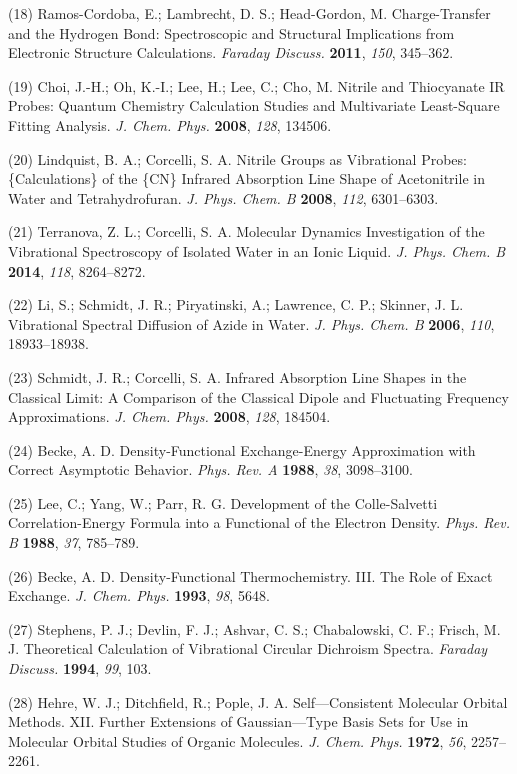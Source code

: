 (18) Ramos-Cordoba, E.; Lambrecht, D. S.; Head-Gordon, M.  Charge-Transfer and the Hydrogen Bond: Spectroscopic and Structural Implications from Electronic Structure Calculations. \emph{Faraday Discuss.} \textbf{2011}, \emph{150}, 345--362.

(19) Choi, J.-H.; Oh, K.-I.; Lee, H.; Lee, C.; Cho, M. Nitrile and Thiocyanate IR Probes: Quantum Chemistry Calculation Studies and Multivariate Least-Square Fitting Analysis. \emph{J. Chem. Phys.}  \textbf{2008}, \emph{128}, 134506.

(20) Lindquist, B. A.; Corcelli, S. A. Nitrile Groups as Vibrational Probes: \{Calculations\} of the \{CN\} Infrared Absorption Line Shape of Acetonitrile in Water and Tetrahydrofuran. \emph{J. Phys. Chem. B} \textbf{2008}, \emph{112}, 6301--6303.

(21) Terranova, Z. L.; Corcelli, S. A. Molecular Dynamics Investigation of the Vibrational Spectroscopy of Isolated Water in an Ionic Liquid.  \emph{J. Phys. Chem. B} \textbf{2014}, \emph{118}, 8264--8272.

(22) Li, S.; Schmidt, J. R.; Piryatinski, A.; Lawrence, C. P.; Skinner, J. L. Vibrational Spectral Diffusion of Azide in Water. \emph{J. Phys.  Chem. B} \textbf{2006}, \emph{110}, 18933--18938.

(23) Schmidt, J. R.; Corcelli, S. A. Infrared Absorption Line Shapes in the Classical Limit: A Comparison of the Classical Dipole and Fluctuating Frequency Approximations. \emph{J. Chem. Phys.}  \textbf{2008}, \emph{128}, 184504.

(24) Becke, A. D. Density-Functional Exchange-Energy Approximation with Correct Asymptotic Behavior. \emph{Phys. Rev. A} \textbf{1988}, \emph{38}, 3098--3100.

(25) Lee, C.; Yang, W.; Parr, R. G. Development of the Colle-Salvetti Correlation-Energy Formula into a Functional of the Electron Density.  \emph{Phys. Rev. B} \textbf{1988}, \emph{37}, 785--789.

(26) Becke, A. D. Density-Functional Thermochemistry. III. The Role of Exact Exchange. \emph{J. Chem. Phys.} \textbf{1993}, \emph{98}, 5648.

(27) Stephens, P. J.; Devlin, F. J.; Ashvar, C. S.; Chabalowski, C. F.; Frisch, M. J. Theoretical Calculation of Vibrational Circular Dichroism Spectra. \emph{Faraday Discuss.} \textbf{1994}, \emph{99}, 103.

(28) Hehre, W. J.; Ditchfield, R.; Pople, J. A. Self---Consistent Molecular Orbital Methods. XII. Further Extensions of Gaussian---Type Basis Sets for Use in Molecular Orbital Studies of Organic Molecules.  \emph{J. Chem. Phys.} \textbf{1972}, \emph{56}, 2257--2261.


